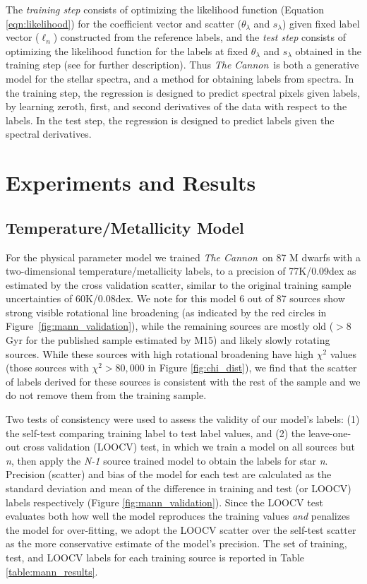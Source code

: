 \documentclass[modern]{aastex62}
\newcommand{\thecannon}{\textsl{The Cannon}}
\begin{document}
The \emph{training step} consists of optimizing the likelihood function (Equation \ref{eqn:likelihood}) for the coefficient vector and scatter ($\theta_{\lambda}$ and $s_{\lambda}$) given fixed label vector (\emph{$\ell_n$}) constructed from the reference labels, and the \emph{test step} consists of optimizing the likelihood function for the labels at fixed $\theta_{\lambda}$ and $s_{\lambda}$ obtained in the training step (see \citealt{Ness:2015} for further description). 
Thus \thecannon\ is both a generative model for the stellar spectra, and a method for obtaining 
labels from spectra. In the training step, the regression is designed to predict spectral pixels
given labels, by learning zeroth, first, and second derivatives of the data with respect to
the labels. In the test step, the regression is designed to predict labels given the spectral
derivatives.

\section{Experiments and Results} \label{sec:results}

\subsection{Temperature/Metallicity Model \label{subsec:mann_results}}
For the physical parameter model we trained \thecannon\ on 87 M dwarfs with a two-dimensional temperature/metallicity labels, to a precision of 77K/0.09dex as estimated by the cross validation scatter, similar to the original training sample uncertainties of 60K/0.08dex. We note for this model 6 out of 87 sources show strong visible rotational line broadening (as indicated by the red circles in Figure~\ref{fig:mann_validation}), while the remaining sources are mostly old ($>8$ Gyr for the published sample estimated by M15) and likely slowly rotating sources. While these sources with high rotational broadening have high $\chi^2$ values (those sources with $\chi^2 > 80,000$ in Figure \ref{fig:chi_dist}), we find that the scatter of labels derived for these sources is consistent with the rest of the sample and we do not remove them from the training sample.

Two tests of consistency were used to assess the validity of our model's labels: (1) the self-test comparing training label to test label values, and (2) the leave-one-out cross validation (LOOCV) test, in which we train a model on all sources but \emph{n}, then apply the \emph{N-1} source trained model to obtain the labels for star \emph{n}. Precision (scatter) and bias of the model for each test are calculated as the standard deviation and mean of the difference in training and test (or LOOCV) labels respectively (Figure \ref{fig:mann_validation}). Since the LOOCV test evaluates both how well the model reproduces the training values \emph{and} penalizes the model for over-fitting, we adopt the LOOCV scatter over the self-test scatter as the more conservative estimate of the model's precision. The set of training, test, and LOOCV labels for each training source is reported in Table \ref{table:mann_results}.
\end{document}
